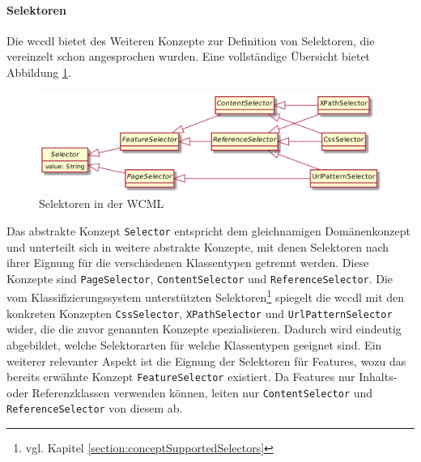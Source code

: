     \paragraph*{Selektoren}
    Die \gls{wccdl} bietet des Weiteren Konzepte zur Definition von Selektoren,
    die vereinzelt schon angesprochen wurden.
    Eine vollständige Übersicht bietet Abbildung \ref{image:dslSelectors}.

    \begin{figure}[htb]
        \centering
        \includegraphics[scale=\imageScalingFactor]{../resources/dsl/selectors.png}
        \caption{Selektoren in der WCML}
        \label{image:dslSelectors}
    \end{figure}

    Das abstrakte Konzept \texttt{Selector} entspricht dem gleichnamigen Domänenkonzept
    und unterteilt sich in weitere abstrakte Konzepte,
    mit denen Selektoren nach ihrer Eignung für die verschiedenen Klassentypen getrennt werden.
    Diese Konzepte sind \texttt{PageSelector}, \texttt{ContentSelector} und \texttt{ReferenceSelector}.
    Die vom Klassifizierungssystem unterstützten
    Selektoren\footnote{vgl. Kapitel \ref{section:conceptSupportedSelectors}}
    spiegelt die \gls{wccdl} mit den konkreten Konzepten
    \texttt{CssSelector}, \texttt{XPathSelector} und \texttt{UrlPatternSelector} wider,
    die die zuvor genannten Konzepte spezialisieren.
    Dadurch wird eindeutig abgebildet, welche Selektorarten für welche Klassentypen geeignet sind.
    Ein weiterer relevanter Aspekt ist die Eignung der Selektoren für Features,
    wozu das bereits erwähnte Konzept \texttt{FeatureSelector} existiert.
    Da Features nur Inhalts- oder Referenzklassen verwenden können,
    leiten nur \texttt{ContentSelector} und \texttt{ReferenceSelector} von diesem ab.
    